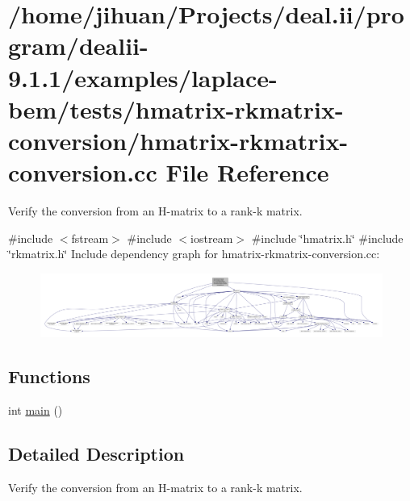 \hypertarget{hmatrix-rkmatrix-conversion_8cc}{}\section{/home/jihuan/\+Projects/deal.ii/program/dealii-\/9.1.1/examples/laplace-\/bem/tests/hmatrix-\/rkmatrix-\/conversion/hmatrix-\/rkmatrix-\/conversion.cc File Reference}
\label{hmatrix-rkmatrix-conversion_8cc}


Verify the conversion from an H-\/matrix to a rank-\/k matrix.  


{\ttfamily \#include $<$fstream$>$}\newline
{\ttfamily \#include $<$iostream$>$}\newline
{\ttfamily \#include \char`\"{}hmatrix.\+h\char`\"{}}\newline
{\ttfamily \#include \char`\"{}rkmatrix.\+h\char`\"{}}\newline
Include dependency graph for hmatrix-\/rkmatrix-\/conversion.cc\+:
\nopagebreak
\begin{figure}[H]
\begin{center}
\leavevmode
\includegraphics[width=350pt]{hmatrix-rkmatrix-conversion_8cc__incl}
\end{center}
\end{figure}
\subsection*{Functions}
\begin{DoxyCompactItemize}
\item 
int \hyperlink{hmatrix-rkmatrix-conversion_8cc_ae66f6b31b5ad750f1fe042a706a4e3d4}{main} ()
\end{DoxyCompactItemize}


\subsection{Detailed Description}
Verify the conversion from an H-\/matrix to a rank-\/k matrix. 

